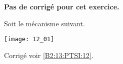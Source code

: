 \normaltrue \difficilefalse \tdifficilefalse
\correctionfalse


\setcounter{question}{0}
\ifcorrection
\else
\textbf{Pas de corrigé pour cet exercice.}
\fi

\ifprof
\else
Soit le mécanisme suivant. 

\begin{center}
\texttt{[image: 12\_01]}
\end{center}
\fi


\ifprof

\else
\fi


\ifprof
\else
\begin{flushright}
\footnotesize{Corrigé  voir \ref{B2:13:PTSI:12}.}
\end{flushright}%
\fi